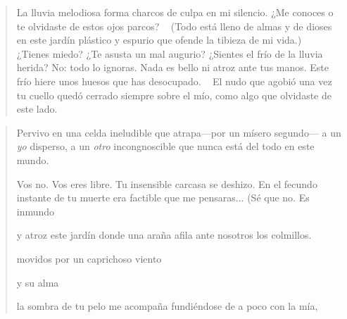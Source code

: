 \documentclass[a4paper, 12pt]{article}
\begin{document}
\pagebreak 


\begin{verse}
    
La lluvia melodiosa forma charcos 
de culpa en mi silencio. ¿Me conoces
o te olvidaste de estos ojos parcos?
~
(Todo está lleno de almas y de dioses
en este jardín plástico y espurio
que ofende la tibieza de mi vida.)
~
¿Tienes miedo? ¿Te asusta un mal augurio?
¿Sientes el frío de la lluvia herida?
No: todo lo ignoras. Nada es bello
ni atroz ante tus manos. Este frío 
hiere unos huesos que has desocupado.
~
El nudo que agobió una vez tu cuello
quedó cerrado siempre sobre el mío,
como algo que olvidaste de este lado.
~
\end{verse}




\pagebreak 

\begin{verse}

Pervivo en una celda ineludible
que atrapa---por un mísero segundo---
a un \textit{yo} disperso, a un \textit{otro} incongnoscible
que nunca está del todo en este mundo.

Vos no. Vos eres libre. Tu insensible
carcasa se deshizo. En el fecundo
instante de tu muerte era factible
que me pensaras... (Sé que no. Es inmundo 

y atroz este jardín donde una araña 
afila ante nosotros los colmillos. 

movidos por un caprichoso viento 






y su alma 



la sombra de tu pelo me acompaña 
fundiéndose de a poco con la mía,




\end{verse}
\end{document}
